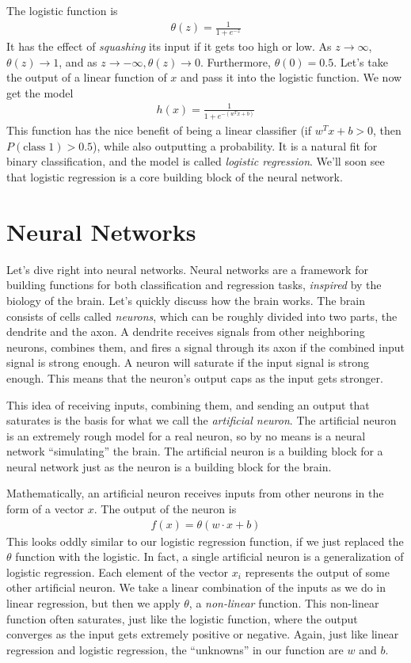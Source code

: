 \documentclass[a4paper,10pt]{article}
\begin{document}
The logistic function is
\begin{align}
  \theta(z) = \frac{1}{1 + e^{-z}}
\end{align}
It has the effect of \emph{squashing} its
input if it gets too high or low.
As $z \rightarrow \infty$, $\theta(z) \rightarrow 1$,
and as $z \rightarrow -\infty, \theta(z) \rightarrow 0$.
Furthermore, $\theta(0) = 0.5$.
Let's take the output of a linear function of $x$
and pass it into the logistic function.
We now get the model
\begin{align}
  h(x) = \frac{1}{1 + e^{-(w^Tx + b)}}
\end{align}
This function has the nice benefit of being a 
linear classifier (if $w^Tx + b > 0$, then
$P(\text{class} \; 1) > 0.5$),
while also outputting a probability.
It is a natural fit for binary classification,
and the model is called \emph{logistic regression}.
We'll soon see that logistic regression is a
core building block of the neural network.

\section{Neural Networks}
Let's dive right into neural networks.
Neural networks are a framework
for building functions
for both classification and regression tasks,
\emph{inspired} by the biology of the brain.
Let's quickly discuss how the brain works.
The brain consists of cells called
\emph{neurons}, which can be roughly divided
into two parts, the dendrite and the axon.
A dendrite receives signals from other neighboring neurons,
combines them, and 
fires a signal through its axon if the combined
input signal is strong enough.
A neuron will saturate if
the input signal is strong enough.
This means that the neuron's output
caps as the input gets stronger.

This idea of receiving inputs,
combining them, and sending an output
that saturates
is the basis for what we call
the \emph{artificial neuron}.
The artificial neuron is an extremely
rough model for a real neuron,
so by no means is a neural
network ``simulating'' the brain.
The artificial neuron is a building block
for a neural network just as the neuron
is a building block for the brain.

Mathematically, an artificial neuron
receives inputs from other neurons
in the form of a vector $x$.
The output of the neuron is
\begin{align*}
  f(x) = \theta(w \cdot x + b)
\end{align*}
This looks oddly similar to our
logistic regression function,
if we just replaced the $\theta$ function
with the logistic.
In fact, a single artificial neuron
is a generalization of logistic regression.
Each element of the vector $x_i$
represents the output of some
other artificial neuron.
We take a linear combination of the inputs
as we do in linear regression, but then we apply
$\theta$, a \emph{non-linear} function.
This non-linear function often saturates,
just like the logistic function,
where the output converges as
the input gets extremely positive or negative.
Again, just like linear regression and
logistic regression, the ``unknowns''
in our function are $w$ and $b$.
\end{document}
